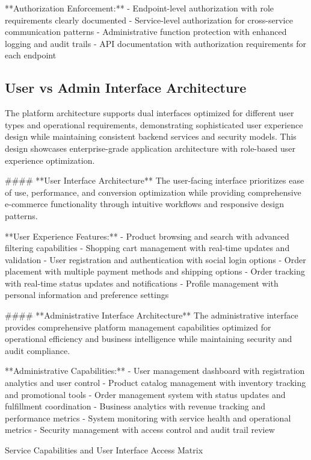 **Authorization Enforcement:**
- Endpoint-level authorization with role requirements clearly documented
- Service-level authorization for cross-service communication patterns
- Administrative function protection with enhanced logging and audit trails
- API documentation with authorization requirements for each endpoint

\subsection{User vs Admin Interface Architecture}

The platform architecture supports dual interfaces optimized for different user types and operational requirements, demonstrating sophisticated user experience design while maintaining consistent backend services and security models. This design showcases enterprise-grade application architecture with role-based user experience optimization.

#### **User Interface Architecture**
The user-facing interface prioritizes ease of use, performance, and conversion optimization while providing comprehensive e-commerce functionality through intuitive workflows and responsive design patterns.

**User Experience Features:**
- Product browsing and search with advanced filtering capabilities
- Shopping cart management with real-time updates and validation
- User registration and authentication with social login options
- Order placement with multiple payment methods and shipping options
- Order tracking with real-time status updates and notifications
- Profile management with personal information and preference settings

#### **Administrative Interface Architecture**
The administrative interface provides comprehensive platform management capabilities optimized for operational efficiency and business intelligence while maintaining security and audit compliance.

**Administrative Capabilities:**
- User management dashboard with registration analytics and user control
- Product catalog management with inventory tracking and promotional tools
- Order management system with status updates and fulfillment coordination
- Business analytics with revenue tracking and performance metrics
- System monitoring with service health and operational metrics
- Security management with access control and audit trail review

\begin{table}[H]
\centering
\caption{Service Capabilities and User Interface Access Matrix}
\label{tab:service-capabilities-matrix}
\end{table}